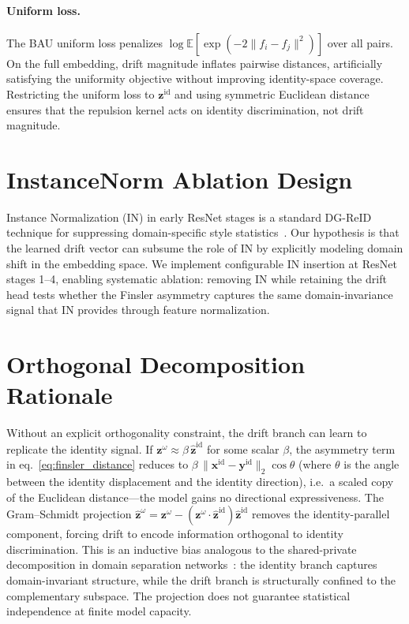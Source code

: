 \paragraph{Uniform loss.}
The BAU uniform loss penalizes $\log \mathbb{E}[\exp(-2\|f_i - f_j\|^2)]$ over all pairs. On the full embedding, drift magnitude inflates pairwise distances, artificially satisfying the uniformity objective without improving identity-space coverage. Restricting the uniform loss to $\mathbf{z}^{\mathrm{id}}$ and using symmetric Euclidean distance ensures that the repulsion kernel acts on identity discrimination, not drift magnitude.

\section{InstanceNorm Ablation Design} \label{sec:suppl_in_ablation}
Instance Normalization (IN) in early ResNet stages is a standard DG-ReID technique for suppressing domain-specific style statistics~\cite{pan2018two}. Our hypothesis is that the learned drift vector can subsume the role of IN by explicitly modeling domain shift in the embedding space. We implement configurable IN insertion at ResNet stages 1--4, enabling systematic ablation: removing IN while retaining the drift head tests whether the Finsler asymmetry captures the same domain-invariance signal that IN provides through feature normalization.

\section{Orthogonal Decomposition Rationale} \label{sec:suppl_orthogonal_rationale}
Without an explicit orthogonality constraint, the drift branch can learn to replicate the identity signal. If $\mathbf{z}^{\omega} \approx \beta\,\hat{\mathbf{z}}^{\mathrm{id}}$ for some scalar $\beta$, the asymmetry term in eq.~\eqref{eq:finsler_distance} reduces to $\beta\,\|\mathbf{x}^{\mathrm{id}}-\mathbf{y}^{\mathrm{id}}\|_2\cos\theta$ (where $\theta$ is the angle between the identity displacement and the identity direction), i.e.\ a scaled copy of the Euclidean distance---the model gains no directional expressiveness. The Gram--Schmidt projection $\hat{\mathbf{z}}^{\omega}=\mathbf{z}^{\omega}-(\mathbf{z}^{\omega}\cdot\hat{\mathbf{z}}^{\mathrm{id}})\hat{\mathbf{z}}^{\mathrm{id}}$ removes the identity-parallel component, forcing drift to encode information orthogonal to identity discrimination. This is an inductive bias analogous to the shared-private decomposition in domain separation networks~\cite{bousmalis2016domain}: the identity branch captures domain-invariant structure, while the drift branch is structurally confined to the complementary subspace. The projection does not guarantee statistical independence at finite model capacity.

